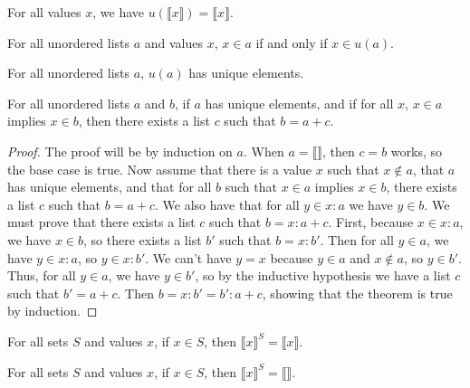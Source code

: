 \documentclass[../../math.tex]{subfiles}
\begin{document}
\begin{theorem} \label{ulist_make_unique_single}
    For all values $x$, we have $u(\llbracket x \rrbracket) = \llbracket x
    \rrbracket$.
\end{theorem}

\begin{theorem} \label{ulist_make_unique_in}
    For all unordered lists $a$ and values $x$, $x \in a$ if and only if $x \in
    u(a)$.
\end{theorem}

\begin{theorem} \label{ulist_make_unique_unique}
    For all unordered lists $a$, $u(a)$ has unique elements.
\end{theorem}

\begin{theorem} \label{ulist_sub_ex}
    For all unordered lists $a$ and $b$, if $a$ has unique elements, and if for
    all $x$, $x \in a$ implies $x \in b$, then there exists a list $c$ such that
    $b = a + c$.
\end{theorem}
\begin{proof}
    The proof will be by induction on $a$.  When $a = \llbracket \rrbracket$,
    then $c = b$ works, so the base case is true.  Now assume that there is a
    value $x$ such that $x \notin a$, that $a$ has unique elements, and that for
    all $b$ such that $x \in a$ implies $x \in b$, there exists a list $c$ such
    that $b = a + c$.  We also have that for all $y \in x : a$ we have $y \in
    b$.  We must prove that there exists a list $c$ such that $b = x : a + c$.
    First, because $x \in x : a$, we have $x \in b$, so there exists a list $b'$
    such that $b = x : b'$.  Then for all $y \in a$, we have $y \in x : a$, so
    $y \in x : b'$.  We can't have $y = x$ because $y \in a$ and $x \notin a$,
    so $y \in b'$.  Thus, for all $y \in a$, we have $y \in b'$, so by the
    inductive hypothesis we have a list $c$ such that $b' = a + c$.  Then $b = x
    : b' = b' : a + c$, showing that the theorem is true by induction.
\end{proof}

\begin{theorem}
    For all sets $S$ and values $x$, if $x \in S$, then $\llbracket
    x\rrbracket^S = \llbracket x\rrbracket$.
\end{theorem}

\begin{theorem}
    For all sets $S$ and values $x$, if $x \in S$, then $\llbracket
    x\rrbracket^S = \llbracket \rrbracket$.
\end{theorem}
\end{document}
